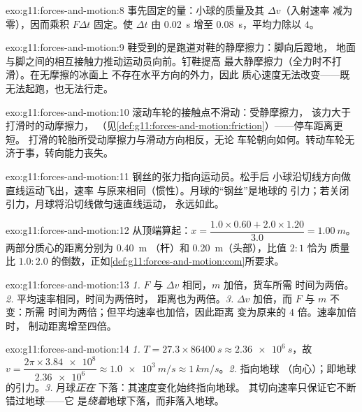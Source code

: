 \begin{solution}{exo:g11:forces-and-motion:8}
事先固定的量：小球的质量及其 $\Delta v$（入射速率
减为零），因而乘积 $F\Delta t$ 固定。使 $\Delta t$ 由
\qty{0.02}{s} 增至 \qty{0.08}{s}，平均力除以 $4$。
\end{solution}

\begin{solution}{exo:g11:forces-and-motion:9}
鞋受到的是跑道对鞋的静摩擦力：脚向后蹬地，
地面与脚之间的相互接触力推动运动员向前。钉鞋提高
最大静摩擦力（全力时不打滑）。在无摩擦的冰面上
不存在水平方向的外力，因此
质心速度无法改变——既无法起跑，也无法行走。
\end{solution}

\begin{solution}{exo:g11:forces-and-motion:10}
滚动车轮的接触点不滑动：受静摩擦力，
该力大于打滑时的动摩擦力，
（见\cref{def:g11:forces-and-motion:friction}）——停车距离更短。
打滑的轮胎所受动摩擦力与滑动方向相反，无论
车轮朝向如何。转动车轮无济于事，转向能力丧失。
\end{solution}

\begin{solution}{exo:g11:forces-and-motion:11}
钢丝的张力指向运动员。松手后
小球沿切线方向做直线运动飞出，速率
与原来相同（惯性）。月球的“钢丝”是地球的
引力；若关闭引力，月球将沿切线做匀速直线运动，
永远如此。
\end{solution}

\begin{solution}{exo:g11:forces-and-motion:12}
从顶端算起：$x = \dfrac{1.0 \times 0.60 + 2.0 \times 1.20}{3.0}
= \qty{1.00}{m}$。两部分质心的距离分别为 \qty{0.40}{m}
（杆）和 \qty{0.20}{m}（头部），比值 $2 : 1$ 恰为
质量比 $1.0 : 2.0$ 的倒数，正如\cref{def:g11:forces-and-motion:com}所要求。
%
\end{solution}

\begin{solution}{exo:g11:forces-and-motion:13}
\emph{1.} $F$ 与 $\Delta v$ 相同，$m$ 加倍，货车所需
时间为两倍。\emph{2.} 平均速率相同，时间为两倍时，
距离也为两倍。\emph{3.} $\Delta v$ 加倍，而 $F$ 与 $m$ 不变：所需
时间为两倍；但平均速率也加倍，因此距离
变为原来的 $4$ 倍。速率加倍时，
制动距离增至四倍。
\end{solution}

\begin{solution}{exo:g11:forces-and-motion:14}
\emph{1.} $T = 27.3 \times \qty{86400}{s} \approx \qty{2.36e6}{s}$，故
$v = \dfrac{2\pi \times \num{3.84e8}}{\num{2.36e6}} \approx
\qty{1.0e3}{m/s} \approx \qty{1}{km/s}$。\emph{2.} 指向地球
（向心）；即地球的引力。\emph{3.} 月球\emph{正在}
下落：其速度变化始终指向地球。
其切向速率只保证它不断错过地球——它
是\emph{绕着}地球下落，而非落入地球。
\end{solution}

